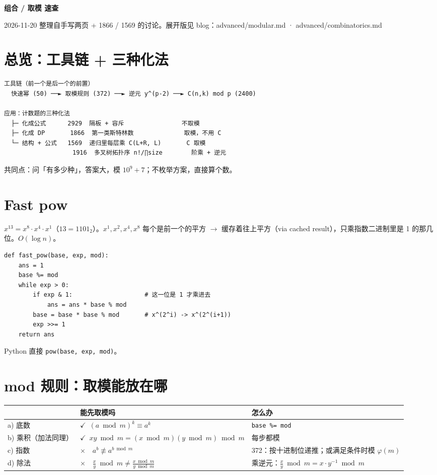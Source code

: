 \documentclass[10pt]{article}
\newcommand{\code}[1]{\texttt{\textcolor{codefg}{#1}}}
\begin{document}
{\LARGE\bfseries 组合 / 取模 速查}\par
{\small\color{note} 2026-11-20 整理自手写两页 + 1866 / 1569 的讨论。展开版见 blog：advanced/modular.md · advanced/combinatorics.md}

\setcounter{section}{-1}
\section{总览：工具链 + 三种化法}

\begin{Verbatim}[fontsize=\small,frame=single,framesep=6pt]
工具链（前一个是后一个的前置）
  快速幂 (50) ──► 取模规则 (372) ──► 逆元 y^(p-2) ──► C(n,k) mod p (2400)

应用：计数题的三种化法
  ├─ 化成公式      2929  隔板 + 容斥                不取模
  ├─ 化成 DP       1866  第一类斯特林数              取模，不用 C
  └─ 结构 + 公式   1569  递归里每层乘 C(L+R, L)       C 取模
                   1916  多叉树拓扑序 n!/∏size        阶乘 + 逆元
\end{Verbatim}

共同点：问「有多少种」，答案大，模 $10^9+7$；不枚举方案，直接算个数。

\section{Fast pow}

$x^{13} = x^8 \cdot x^4 \cdot x^1$（$13 = 1101_2$）。$x^1, x^2, x^4, x^8$ 每个是前一个的平方 $\to$ 缓存着往上平方（via cached result），只乘指数二进制里是 1 的那几位。$O(\log n)$。

\begin{lstlisting}
def fast_pow(base, exp, mod):
    ans = 1
    base %= mod
    while exp > 0:
        if exp & 1:                    # 这一位是 1 才乘进去
            ans = ans * base % mod
        base = base * base % mod       # x^(2^i) -> x^(2^(i+1))
        exp >>= 1
    return ans
\end{lstlisting}
Python 直接 \code{pow(base, exp, mod)}。

\section{mod 规则：取模能放在哪}

\begin{tabularx}{\linewidth}{@{}l l X@{}}
\toprule
& \textbf{能先取模吗} & \textbf{怎么办}\\
\midrule
a) 底数 & $\checkmark$\ $(a \bmod m)^k \equiv a^k$ & \code{base \%= mod}\\
b) 乘积（加法同理） & $\checkmark$\ $xy \bmod m = (x \bmod m)(y \bmod m) \bmod m$ & 每步都模\\
c) 指数 & $\times$\ \ $a^b \not\equiv a^{b \bmod m}$ & 372：按十进制位递推；或满足条件时模 $\varphi(m)$\\
d) 除法 & $\times$\ \ $\frac{x}{y} \bmod m \ne \frac{x \bmod m}{y \bmod m}$ & 乘逆元：$\frac{x}{y} \bmod m = x \cdot y^{-1} \bmod m$\\
\bottomrule
\end{tabularx}
\end{document}
